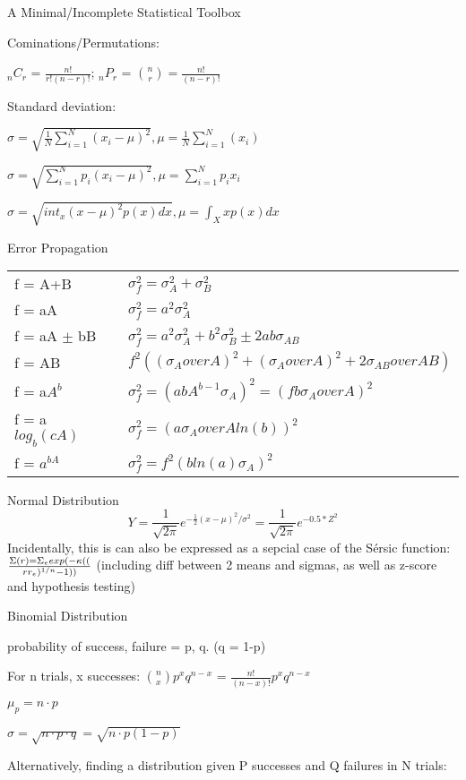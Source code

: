 \documentclass{slides}
\begin{document}
A Minimal/Incomplete Statistical Toolbox

Cominations/Permutations:

$_nC_r$ = $\frac{n!}{r!(n-r)!}$; $_nP_r$ = $\binom{n}{r} = \frac{n!}{(n-r)!}$


Standard deviation:

$\sigma = \sqrt{\frac{1}{N}\sum_{i=1}^{N} (x_i - \mu)^2}, \mu = \frac{1}{N}\sum_{i=1}^{N}(x_i)$

$\sigma = \sqrt{\sum_{i=1}^{N} p_i (x_i -\mu)^2}, \mu = \sum_{i=1}^{N} p_i x_i$

$\sigma = \sqrt{int_{x} (x - \mu)^2p(x)dx}, \mu = \int_{X} x p(x)dx$

\newpage
Error Propagation

\begin{tabular}{l l}
 f = A+B & $\sigma^2_f = \sigma^2_A + \sigma^2_B$ \\
 f = aA & $\sigma^2_f = a^2\sigma^2_A$ \\
 f = aA $\pm$ bB & $\sigma_f^2 = a^2\sigma_A^2 + b^2\sigma_B^2 \pm 2ab\sigma_{AB}$ \\
 f = AB & $f^2 (({\sigma_A}over{A})^2 + ({\sigma_A}over{A})^2 + 2{\sigma_{AB}}over{AB})$ \\ 
 f = a$A^b$ & $\sigma_f^2 = (abA^{b-1}\sigma_A)^2 = ({fb\sigma_A}over{A})^2$ \\
 f = a $log_b(cA)$ & $\sigma_f^2 = (a{\sigma_A}over{A ln(b)})^2$ \\
 f = $a^{bA}$ & $\sigma^2_f = f^2(b ln(a)\sigma_A)^2$ \\
\end{tabular}

\newpage
Normal Distribution
\[
Y = \frac{1}{\sqrt{2\pi}} e^{-\frac{1}{2}(x-\mu)^2/\sigma^2} = \frac{1}{\sqrt{2\pi}} e^{-0.5*Z^2} 
\]
Incidentally, this is can also be expressed as a sepcial case of the S\'ersic function: $\Sigma(r) = \Sigma_e exp(-\kappa((\over{r}{r_e})^{1/n}-1))$
(including diff between 2 means and sigmas, as well as z-score and hypothesis testing)

\newpage
Binomial Distribution

probability of success, failure = p, q. (q = 1-p)

For n trials, x successes: $\binom{n}{x}p^x q^{n-x}$ = $\frac{n!}{(n-x)!}p^x q^{n-x}$

$\mu_p = n \cdot p$

$\sigma = \sqrt{n \cdot p \cdot q} = \sqrt{n \cdot p (1-p)} $

Alternatively, finding a distribution given P successes and Q failures in N trials:
\end{document}
